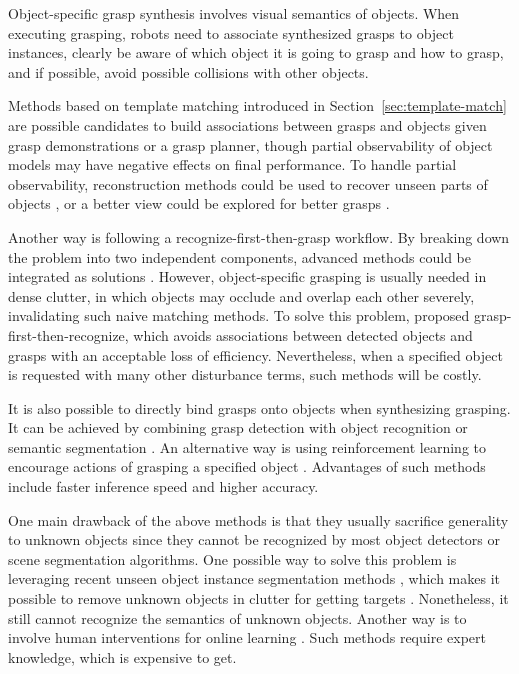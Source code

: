 \documentclass[letterpaper,10pt]{article}
\newcommand{\secref}[1]{Section~\ref{#1}}
\begin{document}
Object-specific grasp synthesis involves visual semantics of objects. 
When executing grasping, robots need to associate synthesized grasps to object instances, clearly be aware of which object it is going to grasp and how to grasp, and if possible, avoid possible collisions with other objects.

Methods based on template matching introduced in \secref{sec:template-match} are possible candidates to build associations between grasps and objects given grasp demonstrations or a grasp planner, though partial observability of object models may have negative effects on final performance.
To handle partial observability, reconstruction methods could be used to recover unseen parts of objects \cite{glover2008probabilistic, yang2021robotic, agnew2021amodal}, or a better view could be explored for better grasps \cite{chen2020transferable}.

Another way is following a recognize-first-then-grasp workflow.
By breaking down the problem into two independent components, advanced methods could be integrated as solutions \cite{zhang2018robotic}.
However, object-specific grasping is usually needed in dense clutter, in which objects may occlude and overlap each other severely, invalidating such naive matching methods.
To solve this problem, \cite{zeng2018robotic} proposed grasp-first-then-recognize, which avoids associations between detected objects and grasps with an acceptable loss of efficiency.
Nevertheless, when a specified object is requested with many other disturbance terms, such methods will be costly.

It is also possible to directly bind grasps onto objects when synthesizing grasping.
It can be achieved by combining grasp detection with object recognition \cite{guo2016object, jang2017end, zhang2019roi} or semantic segmentation \cite{asif2017rgb, chen2020towards, murali20206, dong2021mask, dong2021real, li2021simultaneous, ainetter2021end, ainetter2021depth}.
An alternative way is using reinforcement learning to encourage actions of grasping a specified object \cite{iqbal2020toward}.
Advantages of such methods include faster inference speed and higher accuracy.

One main drawback of the above methods is that they usually sacrifice generality to unknown objects since they cannot be recognized by most object detectors or scene segmentation algorithms.
One possible way to solve this problem is leveraging recent unseen object instance segmentation methods \cite{xiang2020learning, xie2021unseen}, which makes it possible to remove unknown objects in clutter for getting targets \cite{sundermeyer2021contact}.
Nonetheless, it still cannot recognize the semantics of unknown objects.
Another way is to involve human interventions for online learning \cite{kasaei2021simultaneous}.
Such methods require expert knowledge, which is expensive to get.
\end{document}
